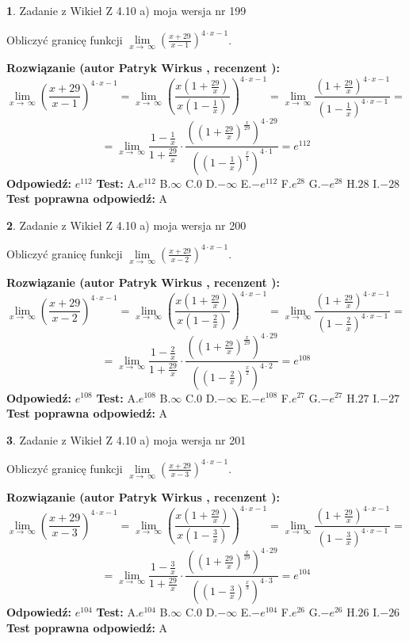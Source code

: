 \documentclass[12pt, a4paper]{article}
\theoremstyle{definition} %
\newtheorem{zad}{}
\newcommand{\zadStart}[1]{\begin{zad}#1\newline}
\newcommand{\zadStop}{\end{zad}}
\newcommand{\rozwStart}[2]{\noindent \textbf{Rozwiązanie (autor #1 , recenzent #2): }\newline}
\newcommand{\rozwStop}{\newline}
\newcommand{\odpStart}{\noindent \textbf{Odpowiedź:}\newline}
\newcommand{\odpStop}{\newline}
\newcommand{\testStart}{\noindent \textbf{Test:}\newline}
\newcommand{\testStop}{\newline}
\newcommand{\kluczStart}{\noindent \textbf{Test poprawna odpowiedź:}\newline}
\newcommand{\kluczStop}{\newline}
\begin{document}
\zadStart{Zadanie z Wikieł Z 4.10 a) moja wersja nr 199}

Obliczyć granicę funkcji  $\lim\limits_{x\to\ \infty}(\frac{x+29}{x-1})^{4\cdot x-1}$.
\zadStop
\rozwStart{Patryk Wirkus}{}
$$\lim\limits_{x\to\ \infty}(\frac{x+29}{x-1})^{4\cdot x-1} = \lim\limits_{x\to\ \infty}(\frac{x(1+\frac{29}{x})}{x(1-\frac{1}{x})})^{4\cdot x-1}=\lim\limits_{x\to\ \infty}\frac{(1+\frac{29}{x})^{4\cdot x-1}}{(1-\frac{1}{x})^{4\cdot x-1}}=$$
$$=\lim\limits_{x\to\ \infty}\frac{1-\frac{1}{x}}{1+\frac{29}{x}}\cdot\frac{((1+\frac{29}{x})^{\frac{x}{29}})^{4\cdot29}}{((1-\frac{1}{x})^{\frac{x}{1}})^{4\cdot1}}=e^{112}$$
\rozwStop
\odpStart
$e^{112}$
\odpStop
\testStart
A.$e^{112}$ B.$\infty$ C.$0$ D.$-\infty$ E.$-e^{112}$
F.$e^{28}$ G.$-e^{28}$
H.$28$
I.$-28$
\testStop
\kluczStart
A
\kluczStop



\zadStart{Zadanie z Wikieł Z 4.10 a) moja wersja nr 200}

Obliczyć granicę funkcji  $\lim\limits_{x\to\ \infty}(\frac{x+29}{x-2})^{4\cdot x-1}$.
\zadStop
\rozwStart{Patryk Wirkus}{}
$$\lim\limits_{x\to\ \infty}(\frac{x+29}{x-2})^{4\cdot x-1} = \lim\limits_{x\to\ \infty}(\frac{x(1+\frac{29}{x})}{x(1-\frac{2}{x})})^{4\cdot x-1}=\lim\limits_{x\to\ \infty}\frac{(1+\frac{29}{x})^{4\cdot x-1}}{(1-\frac{2}{x})^{4\cdot x-1}}=$$
$$=\lim\limits_{x\to\ \infty}\frac{1-\frac{2}{x}}{1+\frac{29}{x}}\cdot\frac{((1+\frac{29}{x})^{\frac{x}{29}})^{4\cdot29}}{((1-\frac{2}{x})^{\frac{x}{2}})^{4\cdot2}}=e^{108}$$
\rozwStop
\odpStart
$e^{108}$
\odpStop
\testStart
A.$e^{108}$ B.$\infty$ C.$0$ D.$-\infty$ E.$-e^{108}$
F.$e^{27}$ G.$-e^{27}$
H.$27$
I.$-27$
\testStop
\kluczStart
A
\kluczStop



\zadStart{Zadanie z Wikieł Z 4.10 a) moja wersja nr 201}

Obliczyć granicę funkcji  $\lim\limits_{x\to\ \infty}(\frac{x+29}{x-3})^{4\cdot x-1}$.
\zadStop
\rozwStart{Patryk Wirkus}{}
$$\lim\limits_{x\to\ \infty}(\frac{x+29}{x-3})^{4\cdot x-1} = \lim\limits_{x\to\ \infty}(\frac{x(1+\frac{29}{x})}{x(1-\frac{3}{x})})^{4\cdot x-1}=\lim\limits_{x\to\ \infty}\frac{(1+\frac{29}{x})^{4\cdot x-1}}{(1-\frac{3}{x})^{4\cdot x-1}}=$$
$$=\lim\limits_{x\to\ \infty}\frac{1-\frac{3}{x}}{1+\frac{29}{x}}\cdot\frac{((1+\frac{29}{x})^{\frac{x}{29}})^{4\cdot29}}{((1-\frac{3}{x})^{\frac{x}{3}})^{4\cdot3}}=e^{104}$$
\rozwStop
\odpStart
$e^{104}$
\odpStop
\testStart
A.$e^{104}$ B.$\infty$ C.$0$ D.$-\infty$ E.$-e^{104}$
F.$e^{26}$ G.$-e^{26}$
H.$26$
I.$-26$
\testStop
\kluczStart
A
\kluczStop
\end{document}
